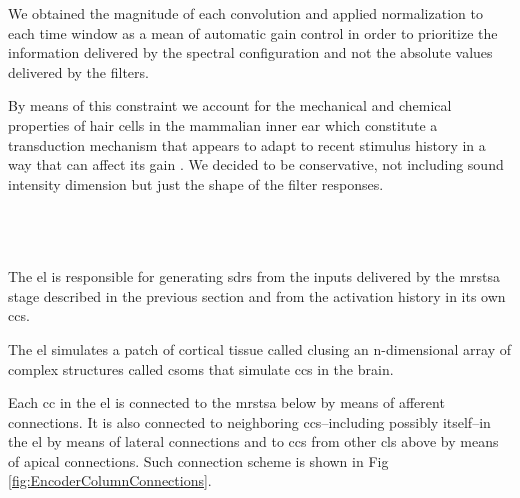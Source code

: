 \documentclass[10pt,letterpaper]{article}
\begin{document}
We obtained the magnitude of each convolution and applied normalization to each time window
as a mean of automatic gain control in order to prioritize the information delivered by the
spectral configuration and not the absolute values delivered by the filters. 

By means of this constraint we account for the mechanical and chemical properties of hair cells in the mammalian inner ear
which constitute a transduction mechanism that appears to adapt to recent stimulus history in a way that can affect its gain
\cite{eatock_2000,holt_2000,le_goff_2005}. 
We decided to be conservative, not including
sound intensity dimension but just the shape of the filter responses.



~\\
~\\
~\\

The \gls{el} is responsible for generating \glspl{sdr} from the inputs delivered by the \gls{mrstsa} stage
described in the previous section and from the activation history in its own \glspl{cc}.

The \gls{el} simulates a patch of cortical tissue called \gls{cl}using an n-dimensional array of complex structures called \glspl{csom} that simulate \glspl{cc} in the brain.

Each \gls{cc} in the \gls{el} is connected to the \gls{mrstsa} below by means of afferent connections. It is also
connected to neighboring \glspl{cc}--including possibly itself--in the \gls{el} by means of lateral connections and
to \glspl{cc} from other \glspl{cl} above by means of apical connections. Such connection scheme is shown in Fig \ref{fig:EncoderColumnConnections}.
\end{document}
